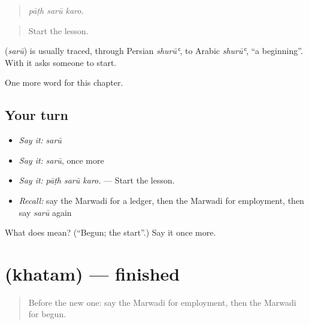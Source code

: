\begin{quote}
  
\end{quote}

\begin{quote}
\emph{pāṭh sarū karo.}
\end{quote}

\begin{quote}
Start the lesson.
\end{quote}

\begin{cousinweb}
\textbf{} (\emph{sarū}) is usually traced, through Persian \emph{shurūʿ}, to Arabic \emph{shurūʿ}, \textquotedblleft{}a beginning\textquotedblright{}. With \textbf{} it asks someone to start.
\end{cousinweb}

\begin{grammarlens}[title={What you've built}]
One more word for this chapter.
\end{grammarlens}

\subsection*{Your turn}
\begin{itemize}
\raggedright
  \item \emph{Say it:} \emph{sarū}
  \item \emph{Say it:} \emph{sarū}, once more
  \item \emph{Say it:} \emph{pāṭh sarū karo.} — Start the lesson.
  \item \emph{Recall:} say the Marwadi for a ledger, then the Marwadi for employment, then say \emph{sarū} again
\end{itemize}

\begin{tcolorbox}[breakable,colback=teal!4,colframe=teal!35!black,title={Before you move on}]
What does  mean? (\textquotedblleft{}Begun; the start\textquotedblright{}.) Say it once more.
\end{tcolorbox}
\section[\texorpdfstring{\mw{खतम} (khatam)}{खतम (khatam)}]{ (khatam) — finished}

\label{lesson:MW-C290-khatam}



\begin{quote}
Before the new one: say the Marwadi for employment, then the Marwadi for begun.
\end{quote}

